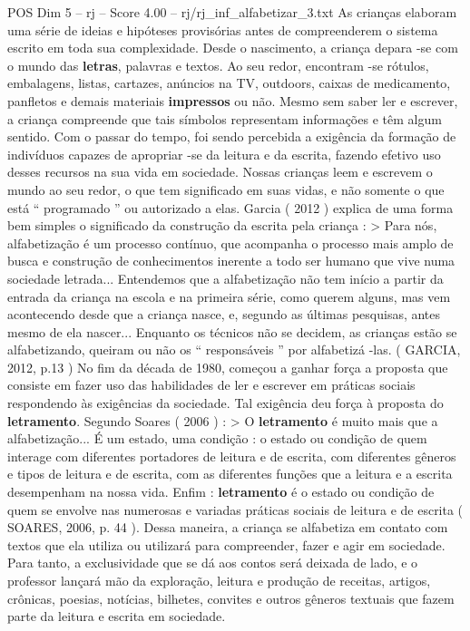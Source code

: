 \begin{textsample}{POS Dim 5 – rj – Score 4.00 – rj/rj\_inf\_alfabetizar\_3.txt}  \label{ex:f5_pos_197}
As crianças elaboram uma série de ideias e hipóteses provisórias antes de compreenderem o sistema escrito em toda sua complexidade.
Desde o nascimento, a criança depara -se com o mundo das \textbf{letras}, palavras e textos.
Ao seu redor, encontram -se rótulos, embalagens, listas, cartazes, anúncios na TV, outdoors, caixas de medicamento, panfletos e demais materiais \textbf{impressos} ou não.
Mesmo sem saber ler e escrever, a criança compreende que tais símbolos representam informações e têm algum sentido.
Com o passar do tempo, foi sendo percebida a exigência da formação de indivíduos capazes de apropriar -se da leitura e da escrita, fazendo efetivo uso desses recursos na sua vida em sociedade.
Nossas crianças leem e escrevem o mundo ao seu redor, o que tem significado em suas vidas, e não somente o que está “ programado ” ou autorizado a elas.
Garcia ( 2012 ) explica de uma forma bem simples o significado da construção da escrita pela criança : > Para nós, alfabetização é um processo contínuo, que acompanha o processo mais amplo de busca e construção de conhecimentos inerente a todo ser humano que vive numa sociedade letrada...
Entendemos que a alfabetização não tem início a partir da entrada da criança na escola e na primeira série, como querem alguns, mas vem acontecendo desde que a criança nasce, e, segundo as últimas pesquisas, antes mesmo de ela nascer...
Enquanto os técnicos não se decidem, as crianças estão se alfabetizando, queiram ou não os “ responsáveis ” por alfabetizá -las. ( GARCIA, 2012, p.13 ) No fim da década de 1980, começou a ganhar força a proposta que consiste em fazer uso das habilidades de ler e escrever em práticas sociais respondendo às exigências da sociedade.
Tal exigência deu força à proposta do \textbf{letramento}.
Segundo Soares ( 2006 ) : > O \textbf{letramento} é muito mais que a alfabetização...
É um estado, uma condição : o estado ou condição de quem interage com diferentes portadores de leitura e de escrita, com diferentes gêneros e tipos de leitura e de escrita, com as diferentes funções que a leitura e a escrita desempenham na nossa vida.
Enfim : \textbf{letramento} é o estado ou condição de quem se envolve nas numerosas e variadas práticas sociais de leitura e de escrita ( SOARES, 2006, p. 44 ).
Dessa maneira, a criança se alfabetiza em contato com textos que ela utiliza ou utilizará para compreender, fazer e agir em sociedade.
Para tanto, a exclusividade que se dá aos contos será deixada de lado, e o professor lançará mão da exploração, leitura e produção de receitas, artigos, crônicas, poesias, notícias, bilhetes, convites e outros gêneros textuais que fazem parte da leitura e escrita em sociedade.

\end{textsample}
